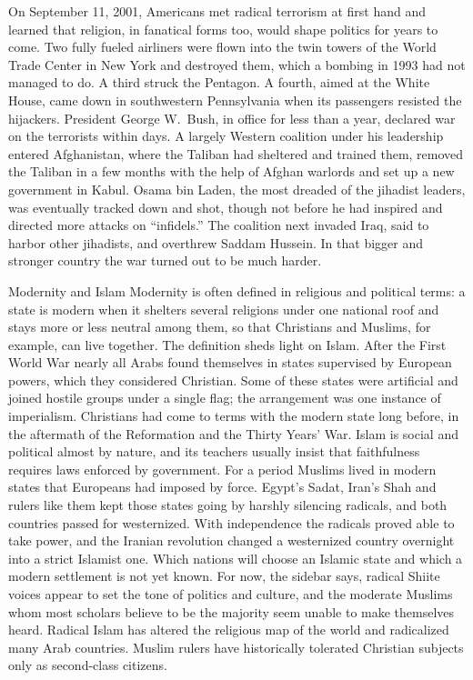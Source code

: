 On September 11, 2001, Americans met radical terrorism at first hand and learned that religion, in
fanatical forms too, would shape politics for years to come. Two fully fueled airliners were flown
into the twin towers of the World Trade Center in New York and destroyed them, which a bombing in
1993 had not managed to do. A third struck the Pentagon. A fourth, aimed at the White House, came
down in southwestern Pennsylvania when its passengers resisted the hijackers. President George
W.~Bush, in office for less than a year, declared war on the terrorists within days. A largely
Western coalition under his leadership entered Afghanistan, where the Taliban had sheltered and
trained them, removed the Taliban in a few months with the help of Afghan warlords and set up a new
government in Kabul. Osama bin Laden, the most dreaded of the jihadist leaders, was eventually
tracked down and shot, though not before he had inspired and directed more attacks on ``infidels.''
The coalition next invaded Iraq, said to harbor other jihadists, and overthrew Saddam Hussein. In
that bigger and stronger country the war turned out to be much harder.

\begin{sidebox}{Modernity and Islam}
Modernity is often defined in religious and political terms: a state is modern when it shelters
several religions under one national roof and stays more or less neutral among them, so that
Christians and Muslims, for example, can live together. The definition sheds light on Islam. After
the First World War nearly all Arabs found themselves in states supervised by European powers, which
they considered Christian. Some of these states were artificial and joined hostile groups under a
single flag; the arrangement was one instance of imperialism. Christians had come to terms with the
modern state long before, in the aftermath of the Reformation and the Thirty Years' War. Islam is
social and political almost by nature, and its teachers usually insist that faithfulness requires
laws enforced by government. For a period Muslims lived in modern states that Europeans had imposed
by force. Egypt's Sadat, Iran's Shah and rulers like them kept those states going by harshly
silencing radicals, and both countries passed for westernized. With independence the radicals proved
able to take power, and the Iranian revolution changed a westernized country overnight into a strict
Islamist one. Which nations will choose an Islamic state and which a modern settlement is not yet
known. For now, the sidebar says, radical Shiite voices appear to set the tone of politics and
culture, and the moderate Muslims whom most scholars believe to be the majority seem unable to make
themselves heard. Radical Islam has altered the religious map of the world and radicalized many Arab
countries. Muslim rulers have historically tolerated Christian subjects only as second-class
citizens.
\end{sidebox}

